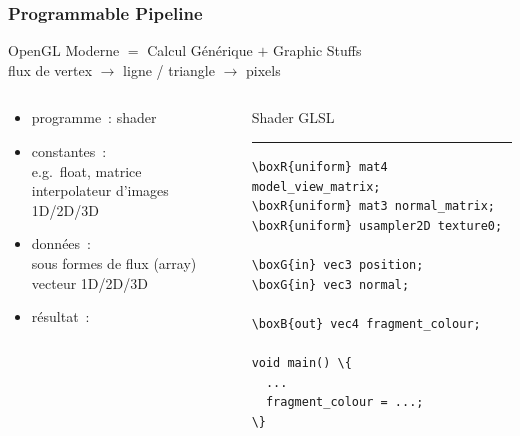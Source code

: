 \begin{frame}[fragile]
  \frametitle{Programmable Pipeline}
  \begin{center}
    OpenGL Moderne $=$ Calcul Générique $+$ Graphic Stuffs \\[1em]
    flux de vertex $\longrightarrow$ ligne / triangle $\longrightarrow$ pixels
  \end{center}
  \begin{columns}
    \begin{column}{.5\textwidth}
      \begin{itemize}
      \item programme~: shader
      \item constantes~:  \\
        e.g.\ float, matrice \\
        interpolateur d'images 1D/2D/3D
      \item données~:  \\
        sous formes de flux (array) \\
        vecteur 1D/2D/3D
      \item résultat~: 
      \end{itemize}
    \end{column}
    \begin{column}{.4\textwidth}
      \begin{center}
        Shader GLSL
        \rule{\textwidth}{1pt}
{\scriptsize%
\begin{Verbatim}[commandchars=\\\{\}]
\boxR{uniform} mat4 model_view_matrix;
\boxR{uniform} mat3 normal_matrix;
\boxR{uniform} usampler2D texture0;

\boxG{in} vec3 position;
\boxG{in} vec3 normal;

\boxB{out} vec4 fragment_colour;

void main() \{
  ...
  fragment_colour = ...;
\}
\end{Verbatim}
}
      \end{center}
    \end{column}
  \end{columns}
\end{frame}

